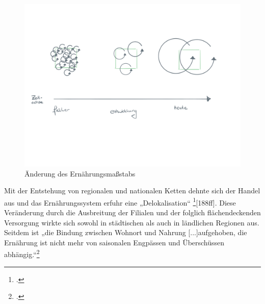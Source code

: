 \documentclass{scrartcl}
\begin{document}
\begin{figure}[htbp]
\centering
\includegraphics[width=12cm]{image_folder/ernahrung.png}
\caption{Änderung des Ernährungsmaßstabs}
\label{fig:massstab}
\end{figure}

Mit der Entstehung von regionalen und nationalen Ketten dehnte sich der Handel aus und das Ernährungssystem erfuhr eine „Delokalisation“ \footcite{MASSIMOMONTANARI1993DerEuropa}[188ff]. Diese Veränderung durch die Ausbreitung der Filialen und der folglich flächendeckenden Versorgung wirkte sich sowohl in städtischen als auch in ländlichen Regionen aus. Seitdem ist „die Bindung zwischen Wohnort und Nahrung [...]aufgehoben, die Ernährung ist nicht mehr von saisonalen Engpässen und Überschüssen abhängig.“\footcite[S.122]{Stierand2008StadtLebensmittel}  
\end{document}
